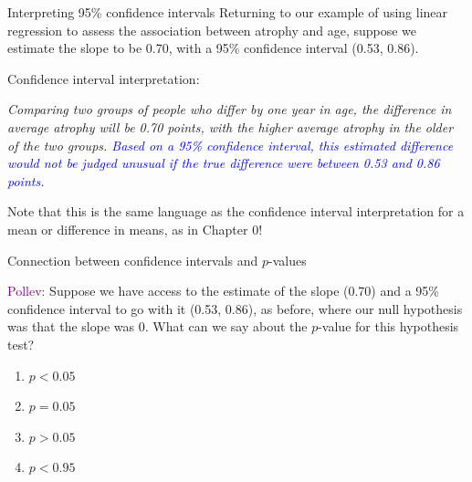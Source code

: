 \documentclass[10pt,t]{beamer}
\begin{document}
\begin{frame}{Interpreting 95\% confidence intervals}
Returning to our example of using linear regression to assess the association between atrophy and age, suppose we estimate the slope to be 0.70, with a 95\% confidence interval (0.53, 0.86).

\vspace{0.3cm}

Confidence interval interpretation:

\vspace{0.3cm}

\textit{Comparing two groups of people who differ by one year in age, the difference in average atrophy will be 0.70 points, with the higher average atrophy in the older of the two groups. \textcolor{blue}{Based on a 95\% confidence interval, this estimated difference would not be judged unusual if the true difference were between 0.53 and 0.86 points.}}

\vspace{0.3cm}

\small Note that this is the same language as the confidence interval interpretation for a mean or difference in means, as in Chapter 0!

\end{frame}

\begin{frame}{Connection between confidence intervals and $p$-values}
	
\textcolor{purple}{Pollev:} Suppose we have access to the estimate of the slope (0.70) and a 95\% confidence interval to go with it (0.53, 0.86), as before, where our null hypothesis was that the slope was $0$. What can we say about the $p$-value for this hypothesis test?

\vspace{0.3cm}

\begin{enumerate}
	\item $p < 0.05$
	\item $p = 0.05$
	\item $p > 0.05$
	\item $p < 0.95$
\end{enumerate}

\end{frame}
\end{document}
